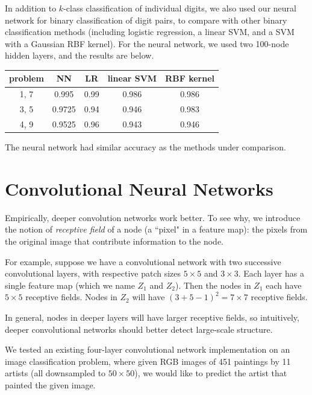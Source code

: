 \documentclass{article}
\begin{document}
\begin{multicols}{2}
In addition to $k$-class classification of individual digits,
we also used our neural network for binary classification of digit pairs,
to compare with other binary classification methods
(including logistic regression, a linear SVM,
and a SVM with a Gaussian RBF kernel).
For the neural network, we used two 100-node hidden layers,
and the results are below.

\begin{center}
\begin{tabular}{c|c|c|c|c}
problem		& NN	& LR		& linear SVM	& RBF kernel \\\hline
        1, 7		& 0.995 	& 0.99 	& 0.986		& 0.986 \\
        3, 5		& 0.9725 	& 0.94 	& 0.946		& 0.983 \\
        4, 9		& 0.9525 	& 0.96 	& 0.943 		& 0.946 \\
\end{tabular}
\end{center}
The neural network had similar accuracy as the methods under comparison.

\section{Convolutional Neural Networks}


Empirically, deeper convolution networks work better.
To see why, we introduce the notion of \emph{receptive field}
of a node (a ``pixel" in a feature map):
the pixels from the original image that contribute information
to the node.

For example,
suppose we have a convolutional network
with two successive convolutional layers,
with respective patch sizes $5\times 5$ and $3\times 3$.
Each layer has a single feature map (which we name $Z_1$ and $Z_2$).
Then the nodes in $Z_1$ each have $5\times 5$ receptive fields.
Nodes in $Z_2$ will have $(3 + 5 - 1)^2 = 7\times 7$ receptive fields.

In general,
nodes in deeper layers will have larger receptive fields,
so intuitively,
deeper convolutional networks should better detect large-scale structure.

We tested an existing four-layer convolutional network implementation
on an image classification problem,
where given RGB images of 451 paintings by 11 artists
(all downsampled to $50\times 50$),
we would like to predict the artist that painted the given image.


\end{multicols}
\end{document}
